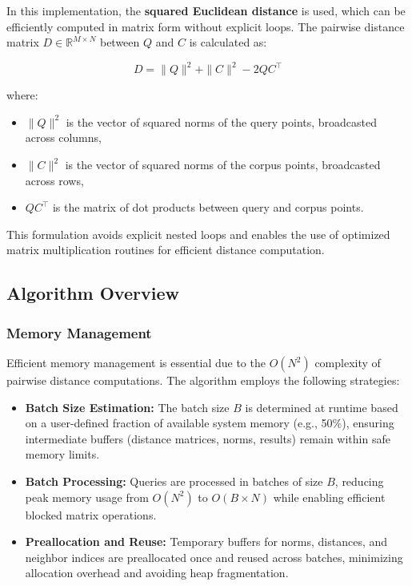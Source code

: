 \documentclass{article}
\begin{document}
In this implementation, the \textbf{squared Euclidean distance} is used, which can be efficiently 
computed in matrix form without explicit loops. The pairwise distance matrix 
$D \in \mathbb{R}^{M \times N}$ between $Q$ and $C$ is calculated as:

\[
D = \|Q\|^2 + \|C\|^2 - 2 Q C^\top
\]

where:
\begin{itemize}
    \item $\|Q\|^2$ is the vector of squared norms of the query points, broadcasted across columns,
    \item $\|C\|^2$ is the vector of squared norms of the corpus points, broadcasted across rows,
    \item $Q C^\top$ is the matrix of dot products between query and corpus points.
\end{itemize}

This formulation avoids explicit nested loops and enables the use of optimized matrix multiplication 
routines for efficient distance computation.

\subsection{Algorithm Overview}

\subsubsection{Memory Management}
Efficient memory management is essential due to the $O(N^2)$ complexity of pairwise distance computations. 
The algorithm employs the following strategies:

\begin{itemize}
    \item \textbf{Batch Size Estimation:} The batch size $B$ is determined at runtime based on a user-defined 
    fraction of available system memory (e.g., 50\%), ensuring intermediate buffers (distance matrices, norms,
    results) remain within safe memory limits.
    
    \item \textbf{Batch Processing:} Queries are processed in batches of size $B$, reducing peak memory usage 
    from $O(N^2)$ to $O(B \times N)$ while enabling efficient blocked matrix operations.
    
    \item \textbf{Preallocation and Reuse:} Temporary buffers for norms, distances, and neighbor indices are 
    preallocated once and reused across batches, minimizing allocation overhead and avoiding heap fragmentation.
\end{itemize}
\end{document}
